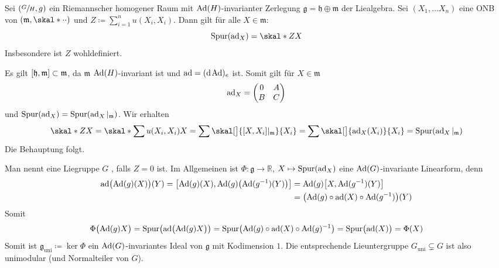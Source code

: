 \begin{lemma}[{name=[Konstruktion von Z]}]
	Sei $\enbrace*{\sfrac{G}{H},g}$ ein Riemannscher homogener Raum mit $\Ad(H)$-invarianter Zerlegung $\mathfrak{g} = \mathfrak{h} \oplus \mathfrak{m}$ der Liealgebra.
	Sei $(X_1,\ldots X_n)$ eine ONB von $\enbrace*{\mathfrak{m},\skal*{\cdot }{\cdot}}$ und $Z \coloneqq \sum_{i=1}^{n} u(X_i,X_i)$.
	Dann gilt für alle $X \in \mathfrak{m}$:
	\[
		\operatorname{Spur} (\ad_X) = \skal*{Z}{X}
	\]
	Insbesondere ist $Z$ wohldefiniert.
\end{lemma}
\begin{beweis}
	Es gilt $\benbrace*{\mathfrak{h},\mathfrak{m}} \subset \mathfrak{m}$, da $\mathfrak{m}$ $\Ad(H)$-invariant ist und $\ad = (\mathd \Ad)_e$ ist.
	Somit gilt für $X \in \mathfrak{m}$
	\[
		\ad_X = \begin{pmatrix}
			0 & A \\ B & C
		\end{pmatrix}
	\]
	und $\operatorname{Spur} (\ad_X) = \operatorname{Spur}(\ad_X|_\mathfrak{m})$.
	Wir erhalten 
	\begin{align}
		\skal*{Z}{X} = \skal*{\sum u(X_i,X_i)}{X} = \sum \skal[\big]{\benbrace*{X,X_i}|_\mathfrak{m}}{X_i} = \sum \skal[\big]{\ad_X(X_i)}{X_i} = \operatorname{Spur}(\ad_X|_\mathfrak{m})
	\end{align}
	Die Behauptung folgt.
\end{beweis}

Man nennt eine Liegruppe $G$ , falls $Z=0$ ist.
Im Allgemeinen ist  $\Phi \colon \mathfrak{g} \to \mathbb{R}$, $X \mapsto \operatorname{Spur} (\ad_X)$  eine $\Ad(G)$-invariante Linearform, denn
\begin{align}
	\ad \enbrace[\big]{\Ad(g)(X)}(Y) = \benbrace*{\Ad(g)(X),\Ad(g) \enbrace*{\Ad(g^{-1})(Y)}} &= \Ad(g) \benbrace*{X, \Ad(g^{-1})(Y)} \\
	&= \enbrace*{\Ad(g) \circ \ad(X) \circ \Ad(g^{-1})}(Y)
\end{align}
Somit 
\[
	\Phi \enbrace[\big]{\Ad(g) X} = \operatorname{Spur} \enbrace*{\ad \enbrace[\big]{\Ad(g) X}} = \operatorname{Spur} \enbrace*{\Ad(g) \circ \ad(X) \circ \Ad(g)^{-1}} = \operatorname{Spur} \enbrace[\big]{\ad(X)} = \Phi(X)
\]
Somit ist $\mathfrak{g}_\mathrm{uni} \coloneqq \ker \Phi$ ein $\Ad(G)$-invariantes Ideal von $\mathfrak{g}$ mit Kodimension $1$.
Die entsprechende Lieuntergruppe $G_\mathrm{uni} \subsetneq G$ ist also unimodular (und Normalteiler von $G$).


